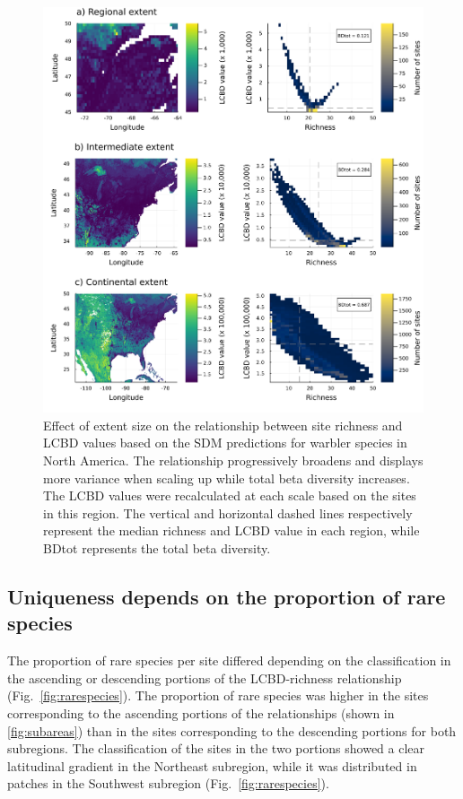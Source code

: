 \documentclass[11pt]{article}
\makeatletter
\def\maxwidth{\ifdim\Gin@nat@width>\linewidth\linewidth
\else\Gin@nat@width\fi}
\let\Oldincludegraphics\includegraphics
\renewcommand{\includegraphics}[1]{\Oldincludegraphics[width=\maxwidth]{#1}}
\makeatother
\begin{document}
\begin{figure}
\hypertarget{fig:extents}{%
\centering
\includegraphics{figures/subareas-extents.png}
\caption{Effect of extent size on the relationship between site richness
and LCBD values based on the SDM predictions for warbler species in
North America. The relationship progressively broadens and displays more
variance when scaling up while total beta diversity increases. The LCBD
values were recalculated at each scale based on the sites in this
region. The vertical and horizontal dashed lines respectively represent
the median richness and LCBD value in each region, while BDtot
represents the total beta diversity.}\label{fig:extents}
}
\end{figure}

\hypertarget{uniqueness-depends-on-the-proportion-of-rare-species}{%
\subsection{Uniqueness depends on the proportion of rare
species}\label{uniqueness-depends-on-the-proportion-of-rare-species}}

The proportion of rare species per site differed depending on the
classification in the ascending or descending portions of the
LCBD-richness relationship (Fig.~\ref{fig:rarespecies}). The proportion
of rare species was higher in the sites corresponding to the ascending
portions of the relationships (shown in \ref{fig:subareas}) than in the
sites corresponding to the descending portions for both subregions. The
classification of the sites in the two portions showed a clear
latitudinal gradient in the Northeast subregion, while it was
distributed in patches in the Southwest subregion
(Fig.~\ref{fig:rarespecies}).
\end{document}
